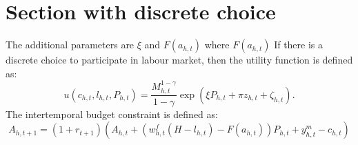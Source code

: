 \section{Section with discrete choice}
The additional parameters are $\xi$ and $F(a_{h,t})$ where $F(a_{h,t})$
If there is a discrete choice to participate in labour market, then the utility function is defined as:
\[ u(c_{h,t},l_{h,t},P_{h,t}) = \frac{M^{1-\gamma}_{h,t}}{1 - \gamma} \exp{(\xi P_{h,t} + \pi z_{h,t} + \zeta_{h,t} )} .\]
The intertemporal budget constraint is defined as:
\[ A_{h,t+1} = (1 + r_{t+1}) \left( A_{h,t} + \left(w_{h,t}^f(H-l_{h,t}) - F(a_{h,t}) \right)P_{h,t} + y_{h,t}^m - c_{h,t} \right)\]
